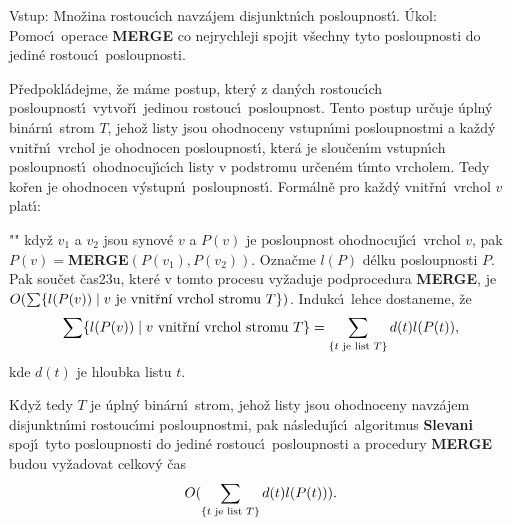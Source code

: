 \flushpar Vstup: Mno\v zina rostouc\'\i ch navz\'ajem 
disjunktn\'\i ch posloupnost\'\i .\newline 
\'Ukol:  Pomoc\'\i\ operace {\bf MERGE} co nejrychleji spojit 
v\v sechny tyto posloupnosti do jedin\'e rostouc\'\i\ posloupnosti.  
\medskip

\flushpar P\v redpokl\'adejme, \v ze m\'ame postup, kter\'y z 
dan\'ych rostouc\'\i ch posloupnost\'\i\ vytvo\v r\'\i\ 
jedinou rostouc\'\i\ po\-sloupnost. Tento postup ur\v cuje \'upln\'y 
bin\'arn\'\i\ strom $T$, jeho\v z listy jsou ohodnoceny vstupn\'\i mi 
posloupnostmi a ka\v zd\'y vnit\v rn\'\i\ vr\-chol je ohodnocen 
posloupnost\'\i , kter\'a je slou\v cen\'\i m vstupn\'\i ch posloupnost\'\i\ 
ohodnocuj\'\i c\'\i ch listy v podstromu ur\v cen\'em t\'\i mto 
vr\-cholem. Tedy ko\v ren je ohodnocen v\'ystupn\'\i\ posloupnost\'\i . 
Form\'aln\v e pro ka\v zd\'y vnit\v rn\'\i\ vr\-chol  $v$ plat\'\i :
\roster
\item"{}"
kdy\v z  $v_1$ a $v_2$ jsou synov\'e $v$ a $P(v)$ je posloupnost 
ohodnocuj\'\i c\'\i\ vrchol $v$,  pak\newline 
$P(v)=${\bf MERGE$(P(v_1),P(v_2))$}.
\endroster
Ozna\v cme $l(P)$ d\'elku posloupnosti $P$. Pak sou\v cet 
\v cas\accent23u, kter\'e v tomto procesu vy\v zaduje 
podprocedura {\bf MERGE},
je $O(\sum \{l(P(v))\mid v\text{\rm \ je vnit\v rn\'\i\ vrchol stromu }
T\})$. Indukc\'\i\ 
lehce dostaneme, \v ze 
$$\sum \{l(P(v))\mid v\text{\rm \ vnit\v rn\'\i\ vrchol stromu }T
\}=\sum_{\{t\text{\rm \ je list }T\}}d(t)l(P(t)),$$
kde $d(t)$ je hloubka listu $t$.
\medskip

\flushpar Kdy\v z tedy $T$ je \'upln\'y bin\'arn\'\i\ strom, jeho\v z listy
jsou ohodnoceny navz\'ajem disjunktn\'\i mi rostouc\'\i mi  
posloupnostmi, pak n\'asleduj\'\i c\'\i\ algoritmus {\bf Slevani} spoj\'\i\ tyto  
posloupnosti do jedin\'e rostouc\'\i\ posloupnosti a procedury 
{\bf MERGE} budou vy\v zadovat celkov\'y \v cas 
$$O(\sum_{\{t\text{\rm \ je list }T\}}d(t)l(P(t))).$$
\bigskip

